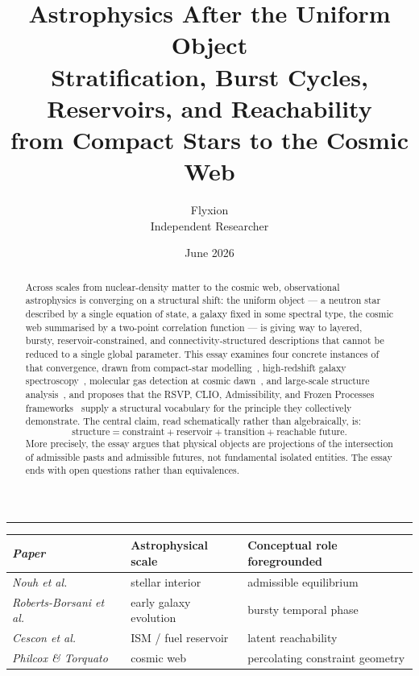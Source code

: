 \documentclass[12pt, oneside]{article}
\title{\textbf{Astrophysics After the Uniform Object}\\[0.5em]
\large Stratification, Burst Cycles, Reservoirs, and Reachability\\
from Compact Stars to the Cosmic Web}
\author{Flyxion\\[0.3em]\small Independent Researcher}
\date{June 2026}
\begin{document}
\maketitle
\thispagestyle{empty}

\begin{abstract}
\noindent
Across scales from nuclear-density matter to the cosmic web, observational astrophysics is converging on a structural shift: the uniform object --- a neutron star described by a single equation of state, a galaxy fixed in some spectral type, the cosmic web summarised by a two-point correlation function --- is giving way to layered, bursty, reservoir-constrained, and connectivity-structured descriptions that cannot be reduced to a single global parameter. This essay examines four concrete instances of that convergence, drawn from compact-star modelling~\cite{nouh2026}, high-redshift galaxy spectroscopy~\cite{roberts2026}, molecular gas detection at cosmic dawn~\cite{cescon2026}, and large-scale structure analysis~\cite{philcox2023}, and proposes that the RSVP, CLIO, Admissibility, and Frozen Processes frameworks~\cite{flyxion_frameworks} supply a structural vocabulary for the principle they collectively demonstrate. The central claim, read schematically rather than algebraically, is:
\[
\text{structure} = \text{constraint} + \text{reservoir} + \text{transition} + \text{reachable future}.
\]
More precisely, the essay argues that physical objects are projections of the intersection of admissible pasts and admissible futures, not fundamental isolated entities. The essay ends with open questions rather than equivalences.
\end{abstract}

\vspace{0.5em}
\noindent\rule{\linewidth}{0.4pt}
\vspace{0.5em}

\begin{center}
\begin{tabular}{>{\itshape}l l l}
\toprule
Paper & Astrophysical scale & Conceptual role foregrounded \\
\midrule
Nouh et al.~\cite{nouh2026} & stellar interior & admissible equilibrium \\
Roberts-Borsani et al.~\cite{roberts2026} & early galaxy evolution & bursty temporal phase \\
Cescon et al.~\cite{cescon2026} & ISM / fuel reservoir & latent reachability \\
Philcox \& Torquato~\cite{philcox2023} & cosmic web & percolating constraint geometry \\
\bottomrule
\end{tabular}
\end{center}
\end{document}

